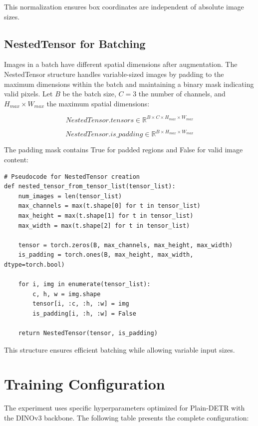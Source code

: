 \documentclass[12pt,a4paper]{article}
\begin{document}
This normalization ensures box coordinates are independent of absolute image sizes.

\subsection{NestedTensor for Batching}

Images in a batch have different spatial dimensions after augmentation. The NestedTensor structure handles variable-sized images by padding to the maximum dimensions within the batch and maintaining a binary mask indicating valid pixels. Let $B$ be the batch size, $C=3$ the number of channels, and $H_{max} \times W_{max}$ the maximum spatial dimensions:

\begin{equation}
NestedTensor.tensors \in \mathbb{R}^{B \times C \times H_{max} \times W_{max}}
\end{equation}

\begin{equation}
NestedTensor.is\_padding \in \mathbb{R}^{B \times H_{max} \times W_{max}}
\end{equation}

The padding mask contains True for padded regions and False for valid image content:

\begin{verbatim}
# Pseudocode for NestedTensor creation
def nested_tensor_from_tensor_list(tensor_list):
    num_images = len(tensor_list)
    max_channels = max(t.shape[0] for t in tensor_list)
    max_height = max(t.shape[1] for t in tensor_list)
    max_width = max(t.shape[2] for t in tensor_list)
    
    tensor = torch.zeros(B, max_channels, max_height, max_width)
    is_padding = torch.ones(B, max_height, max_width, dtype=torch.bool)
    
    for i, img in enumerate(tensor_list):
        c, h, w = img.shape
        tensor[i, :c, :h, :w] = img
        is_padding[i, :h, :w] = False
    
    return NestedTensor(tensor, is_padding)
\end{verbatim}

This structure ensures efficient batching while allowing variable input sizes.

\section{Training Configuration}

The experiment uses specific hyperparameters optimized for Plain-DETR with the DINOv3 backbone. The following table presents the complete configuration:
\end{document}
